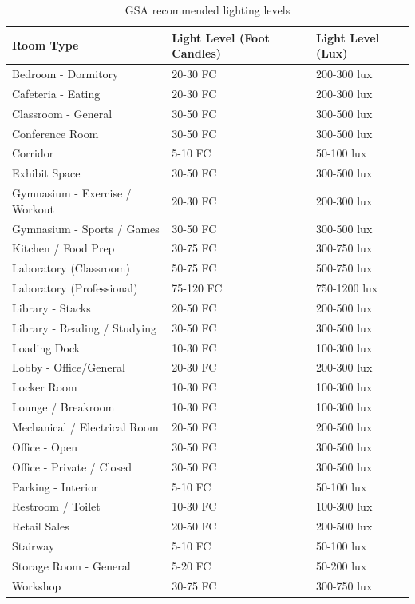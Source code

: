 \begin{table} \centering
\caption{GSA recommended lighting levels \label{table:lighting-level-chart}}
\tabularnewline
\begin{tabular}{ |p{2in}|p{1in}|p{1in}| } \hline \textbf{Room Type} &
\textbf{Light Level (Foot Candles)} & \textbf{Light Level (Lux)} \\
\hline
Bedroom - Dormitory & 20-30 FC & 200-300 lux \\
\hline
Cafeteria - Eating & 20-30 FC & 200-300 lux \\
\hline
Classroom - General & 30-50 FC & 300-500 lux \\
\hline
Conference Room & 30-50 FC & 300-500 lux \\
\hline
Corridor & 5-10 FC & 50-100 lux \\
\hline Exhibit Space & 30-50 FC & 300-500 lux \\
\hline
Gymnasium - Exercise / Workout & 20-30 FC & 200-300 lux \\
\hline
Gymnasium - Sports / Games & 30-50 FC & 300-500 lux \\
 \hline Kitchen / Food Prep & 30-75 FC &
300-750 lux \\
 \hline Laboratory (Classroom) & 50-75 FC & 500-750 lux \\
 \hline
Laboratory (Professional) & 75-120 FC & 750-1200 lux \\
 \hline Library - Stacks
& 20-50 FC & 200-500 lux \\
 \hline Library - Reading / Studying & 30-50 FC &
300-500 lux \\
 \hline Loading Dock & 10-30 FC & 100-300 lux \\
 \hline Lobby -
Office/General & 20-30 FC & 200-300 lux \\
 \hline Locker Room & 10-30 FC &
100-300 lux \\
 \hline Lounge / Breakroom & 10-30 FC & 100-300 lux \\
 \hline
Mechanical / Electrical Room & 20-50 FC & 200-500 lux \\
 \hline Office - Open &
30-50 FC & 300-500 lux \\
 \hline Office - Private / Closed & 30-50 FC & 300-500
lux \\
 \hline Parking - Interior & 5-10 FC & 50-100 lux \\
 \hline Restroom /
Toilet & 10-30 FC & 100-300 lux \\
 \hline Retail Sales & 20-50 FC & 200-500 lux
\\
 \hline Stairway & 5-10 FC & 50-100 lux \\
 \hline Storage Room - General &
5-20 FC & 50-200 lux \\
 \hline Workshop & 30-75 FC & 300-750 lux \\
 \hline
\end{tabular}
\end{table}

